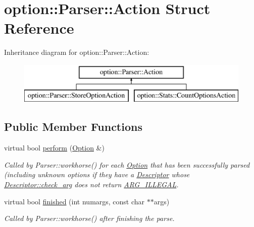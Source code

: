 \hypertarget{structoption_1_1Parser_1_1Action}{}\section{option\+:\+:Parser\+:\+:Action Struct Reference}
\label{structoption_1_1Parser_1_1Action}
Inheritance diagram for option\+:\+:Parser\+:\+:Action\+:\begin{figure}[H]
\begin{center}
\leavevmode
\includegraphics[height=2.000000cm]{structoption_1_1Parser_1_1Action}
\end{center}
\end{figure}
\subsection*{Public Member Functions}
\begin{DoxyCompactItemize}
\item 
virtual bool \hyperlink{structoption_1_1Parser_1_1Action_a176b5f783bb35eb015b6d2c09422457d}{perform} (\hyperlink{classoption_1_1Option}{Option} \&)
\begin{DoxyCompactList}\small\item\em Called by Parser\+::workhorse() for each \hyperlink{classoption_1_1Option}{Option} that has been successfully parsed (including unknown options if they have a \hyperlink{structoption_1_1Descriptor}{Descriptor} whose \hyperlink{structoption_1_1Descriptor_aa5d675dba0214a4abd73007ff163cc67}{Descriptor\+::check\+\_\+arg} does not return \hyperlink{namespaceoption_aee8c76a07877335762631491e7a5a1a9a9528e32563b795bd2930b12d0a5e382d}{A\+R\+G\+\_\+\+I\+L\+L\+E\+G\+AL}. \end{DoxyCompactList}\item 
virtual bool \hyperlink{structoption_1_1Parser_1_1Action_a3ec558b51e34d33d116f14587289e032}{finished} (int numargs, const char $\ast$$\ast$args)
\begin{DoxyCompactList}\small\item\em Called by Parser\+::workhorse() after finishing the parse. \end{DoxyCompactList}\end{DoxyCompactItemize}


